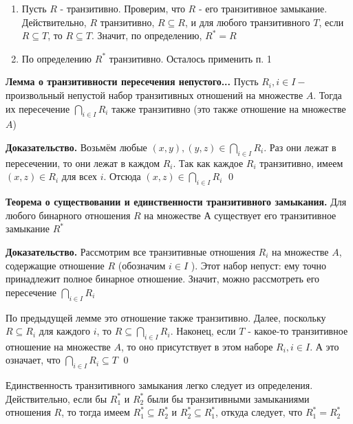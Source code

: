 \documentclass[a4paper]{article}
\begin{document}
\proof
\begin{enumerate}
    \item Пусть $R$ - транзитивно. Проверим, что $R$ - его транзитивное замыкание. Действительно, $R$ транзитивно, $R \subseteq R$, и для любого транзитивного $T$, если $R \subseteq T$, то $R \subseteq T$. Значит, по определению, $R^{*}=R$
    \item По определению $R^{*}$ транзитивно. Осталось применить п. 1
\end{enumerate}

\textbf{Лемма о транзитивности пересечения непустого...} Пусть $R_{i}, i \in I-$ произвольный непустой набор транзитивных отношений на множестве $A$. Тогда их пересечение $\bigcap_{i \in I} R_{i}$ также транзитивно (это также отношение на множестве $A$)

\textbf{Доказательство.} Возьмём любые $(x, y),(y, z) \in \bigcap_{i \in I} R_{i}$. Раз они лежат в пересечении, то они лежат в каждом $R_{i}$. Так как каждое $R_{i}$ транзитивно, имеем $(x, z) \in R_{i}$ для всех $i$. Отсюда $(x, z) \in \bigcap_{i \in I} R_{i}$ \qed

\textbf{Теорема о существовании и единственности транзитивного замыкания.} Для любого бинарного отношения $R$ на множестве А существует его транзитивное замыкание $R^{*}$

\textbf{Доказательство.} Рассмотрим все транзитивные отношения $R_{i}$ на множестве $A$, содержащие отношение $R$ (обозначим $i \in I$ ). Этот набор непуст: ему точно принадлежит полное бинарное отношение. Значит, можно рассмотреть его пересечение $\bigcap_{i \in I} R_{i}$

По предыдущей лемме это отношение также транзитивно. Далее, поскольку $R \subseteq R_{i}$ для каждого $i$, то $R \subseteq \bigcap_{i \in I} R_{i}$. Наконец, если $T$ - какое-то транзитивное отношение на множестве $A$, то оно присутствует в этом наборе $R_{i}, i \in I$. А это означает, что $\bigcap_{i \in I} R_{i} \subseteq T$ \qed

Единственность транзитивного замыкания легко следует из определения. Действительно, если бы $R_{1}^{*}$ и $R_{2}^{*}$ были бы транзитивными замыканиями отношения $R$, то тогда имеем $R_{1}^{*} \subseteq R_{2}^{*}$ и $R_{2}^{*} \subseteq R_{1}^{*}$, откуда следует, что $R_{1}^{*}=R_{2}^{*}$
\end{document}

